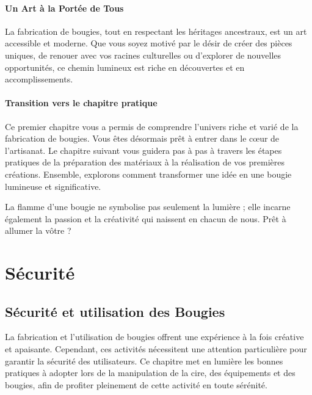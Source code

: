 \documentclass[11pt,fleqn,onecolumn,oneside]{book}
\begin{document}
\subsection*{Un Art à la Portée de Tous}

La fabrication de bougies, tout en respectant les héritages ancestraux, est un art accessible et moderne. Que vous soyez motivé par le désir de créer des pièces uniques, de renouer avec vos racines culturelles ou d’explorer de nouvelles opportunités, ce chemin lumineux est riche en découvertes et en accomplissements.

\subsection*{Transition vers le chapitre pratique}

Ce premier chapitre vous a permis de comprendre l’univers riche et varié de la fabrication de bougies. Vous êtes désormais prêt à entrer dans le cœur de l’artisanat. Le chapitre suivant vous guidera pas à pas à travers les étapes pratiques de la préparation des matériaux à la réalisation de vos premières créations. Ensemble, explorons comment transformer une idée en une bougie lumineuse et significative.

\begin{remark}
La flamme d’une bougie ne symbolise pas seulement la lumière ; elle incarne également la passion et la créativité qui naissent en chacun de nous. Prêt à allumer la vôtre ?
\end{remark}

\part{Sécurité}
\chapter{Sécurité et utilisation des Bougies}

\begin{definition}
La fabrication et l’utilisation de bougies offrent une expérience à la fois créative et apaisante. Cependant, ces activités nécessitent une attention particulière pour garantir la sécurité des utilisateurs. Ce chapitre met en lumière les bonnes pratiques à adopter lors de la manipulation de la cire, des équipements et des bougies, afin de profiter pleinement de cette activité en toute sérénité.
\end{definition}
\end{document}

